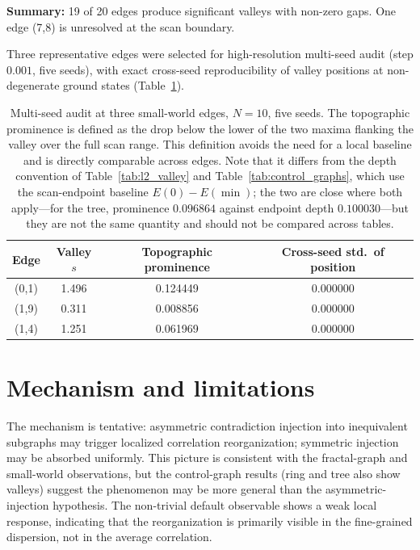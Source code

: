 \documentclass[aps,prb,reprint,superscriptaddress]{revtex4-2}
\begin{document}
\textbf{Summary:} 19 of 20 edges produce significant valleys with non-zero gaps. One edge (7,8) is unresolved at the scan boundary.

Three representative edges were selected for high-resolution multi-seed audit (step $0.001$, five seeds), with exact cross-seed reproducibility of valley positions at non-degenerate ground states (Table~\ref{tab:sw_multiseed}).

\begin{table}[t]
\centering
\caption{Multi-seed audit at three small-world edges, $N=10$, five seeds. The topographic prominence is defined as the drop below the lower of the two maxima flanking the valley over the full scan range. This definition avoids the need for a local baseline and is directly comparable across edges. Note that it differs from the depth convention of Table~\ref{tab:l2_valley} and Table~\ref{tab:control_graphs}, which use the scan-endpoint baseline $E(0)-E(\min)$; the two are close where both apply---for the tree, prominence $0.096864$ against endpoint depth $0.100030$---but they are not the same quantity and should not be compared across tables.}
\label{tab:sw_multiseed}
\begin{tabular}{cccc}
\toprule
Edge & Valley $s$ & Topographic prominence & Cross-seed std.\ of position \\
\midrule
(0,1) & 1.496 & 0.124449 & 0.000000 \\
(1,9) & 0.311 & 0.008856 & 0.000000 \\
(1,4) & 1.251 & 0.061969 & 0.000000 \\
\bottomrule
\end{tabular}
\end{table}

\section{Mechanism and limitations}

The mechanism is tentative: asymmetric contradiction injection into inequivalent subgraphs may trigger localized correlation reorganization; symmetric injection may be absorbed uniformly. This picture is consistent with the fractal-graph and small-world observations, but the control-graph results (ring and tree also show valleys) suggest the phenomenon may be more general than the asymmetric-injection hypothesis. The non-trivial default observable shows a weak local response, indicating that the reorganization is primarily visible in the fine-grained dispersion, not in the average correlation.
\end{document}
